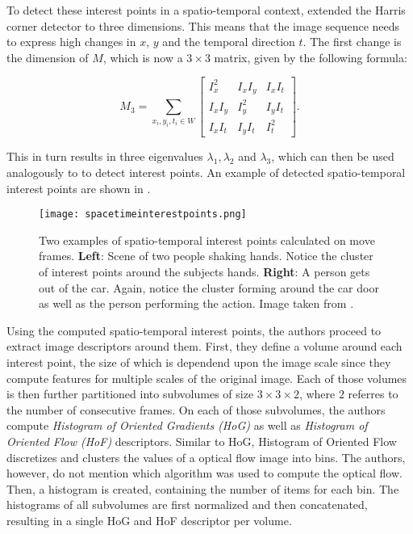 To detect these interest points in a spatio-temporal context, \cite{laptev_harris3d} extended the Harris corner detector to three dimensions.
This means that the image sequence needs to express high changes in $x$, $y$ and the temporal direction $t$.
The first change is the dimension of $M$, which is now a $3 \times 3$ matrix, given by the following formula:

\begin{equation}
    M_3 = \sum_{x_i, y_i, t_i \in W} 
    \begin{bmatrix}
        I_x^2 & I_x I_y & I_x I_t \\
        I_x I_y & I_y^2 & I_y I_t \\
        I_x I_t & I_y I_t & I_t^2
    \end{bmatrix}.
\end{equation}

This in turn results in three eigenvalues $\lambda_1, \lambda_2$ and $\lambda_3$, which can then be used analogously to \cite{harris_combined_1988} to detect interest points.
An example of detected spatio-temporal interest points are shown in .

\begin{figure}[htb!]
    \centering
    \texttt{[image: spacetimeinterestpoints.png]}
    \caption{Two examples of spatio-temporal interest points calculated on move frames. \textbf{Left}: Scene of two people shaking hands. Notice the cluster of interest points around the subjects hands. \textbf{Right}: A person gets out of the car. Again, notice the cluster forming around the car door as well as the person performing the action. Image taken from \cite{laptev_learning_2008}. }
    \label{fig:spatio-temporal-interestpoints}
\end{figure}

Using the computed spatio-temporal interest points, the authors proceed to extract image descriptors around them.
First, they define a volume around each interest point, the size of which is dependend upon the image scale since they compute features for multiple scales of the original image.
Each of those volumes is then further partitioned into subvolumes of size $3 \times 3 \times 2$, where $2$ referres to the number of consecutive frames.
On each of those subvolumes, the authors compute \textit{Histogram of Oriented Gradients (HoG)} as well as \textit{Histogram of Oriented Flow (HoF)} descriptors.
Similar to HoG, Histogram of Oriented Flow discretizes and clusters the values of a optical flow image into bins.
The authors, however, do not mention which algorithm was used to compute the optical flow.
Then, a histogram is created, containing the number of items for each bin.
The histograms of all subvolumes are first normalized and then concatenated, resulting in a single HoG and HoF descriptor per volume.

